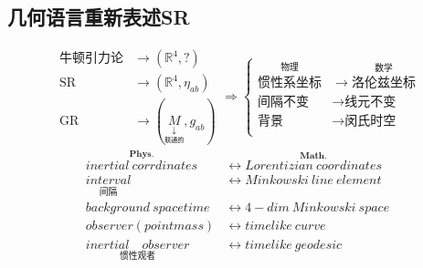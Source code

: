 \subsection{几何语言重新表述SR}
$$
\begin{aligned}
    \text{牛顿引力论}&\to (\mathbb{R}^4,?)\\
    \text{SR}&\to (\mathbb{R}^4,\eta_{ab})\\
    \text{GR}&\to (\underset{\underset{\text{联通的}}{\downarrow}}{M},g_{ab})
\end{aligned}
\Rightarrow
\left\{
\begin{aligned}
\overset{\underset{}{\text{物理}}}{\text{惯性系坐标}}&\to \overset{\underset{}{\text{数学}}}{\text{洛伦兹坐标}}\\
\text{间隔不变}&\to \text{线元不变}\\
\text{背景}&\to \text{闵氏时空}\\
\end{aligned}
\right.
$$
$$
\begin{aligned}
\overset{\boldsymbol{Phys.}}{inertial \ corrdinates} &\longleftrightarrow \overset{\boldsymbol{Math.}}{Lorentizian \ coordinates}\\
\underset{\text{间隔}}{interval}&\longleftrightarrow Minkowski\ line\ element\\
background\ spacetime &\longleftrightarrow 4-dim\ Minkowski \ space\\
observer(point mass) &\longleftrightarrow timelike\ curve\\
\underset{\text{惯性观者}}{inertial\quad observer}&\longleftrightarrow timelike\ geodesic
\end{aligned}
$$


